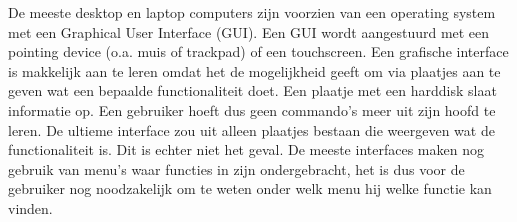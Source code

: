 De meeste desktop en laptop computers zijn voorzien van een operating system met een Graphical User Interface (GUI). Een GUI wordt aangestuurd met een pointing device (o.a. muis of trackpad) of een touchscreen. Een grafische interface is makkelijk aan te leren omdat het de mogelijkheid geeft om via plaatjes aan te geven wat een bepaalde functionaliteit doet. Een plaatje met een harddisk slaat informatie op. Een gebruiker hoeft dus geen commando's meer uit zijn hoofd te leren. De ultieme interface zou uit alleen plaatjes bestaan die weergeven wat de functionaliteit is. Dit is echter niet het geval. De meeste interfaces maken nog gebruik van menu's waar functies in zijn ondergebracht, het is dus voor de gebruiker nog noodzakelijk om te weten onder welk menu hij welke functie kan vinden.

